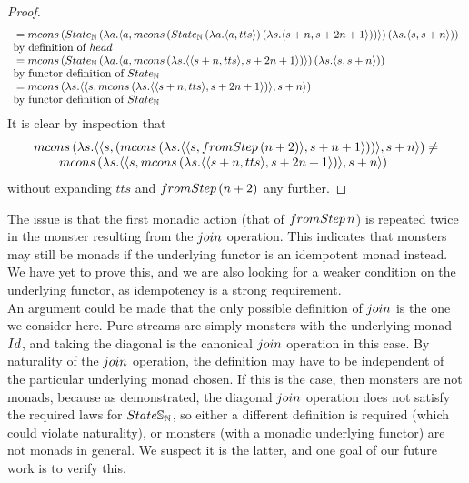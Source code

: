 \begin{proof}
$$\begin{array}{ll}
{}=  \mcons\, (\state_{\nat}\,(\lambda a . \pair{a}{  
\mcons\, (\state_{\nat} \,(\lambda a . \pair{a}{tts})\, (\lambda s . \pair{s + n}{s + 2n + 1}))
})\, (\lambda s. \pair{s}{s + n}))
\\ \mbox{by definition of } \head \\
{}= \mcons\, (\state_{\nat}\,(\lambda a . \pair{a}{  
\mcons\, (\lambda s . \pair{\pair{s + n}{tts}}{s + 2n + 1})
})\, (\lambda s. \pair{s}{s + n})) \\
\mbox{by functor definition of } \state_{\nat}  \\
{}= \mcons\, (\lambda s. \pair{\pair{s}{\mcons\, (\lambda s . \pair{\pair{s + n}{tts}}{s + 2n + 1})}}{s + n}) \\ 
\mbox{by functor definition of } \state_{\nat} \\
\end{array} 
$$
It is clear by inspection that 
$$
\begin{array}{l}
\mcons\, (\lambda s. \pair{\pair{s}{(\mcons\, (\lambda s. \pair{\pair{s}{\fromstepstr\, (n + 2)}}{s + n + 1}))}}{s + n}) \neq \\
\qquad \mcons\, (\lambda s. \pair{\pair{s}{\mcons\, (\lambda s . \pair{\pair{s + n}{tts}}{s + 2n + 1})}}{s + n})
\end{array} 
$$
without expanding $tts$ and $\fromstepstr\, (n + 2)$ any further.
\end{proof}

The issue is that the first monadic action (that of $\fromstepstr\, n$) is repeated twice in the monster resulting from the $\join$ operation. 
This indicates that monsters may still be monads if the underlying functor is an idempotent monad instead. 
We have yet to prove this, and we are also looking for a weaker condition on the underlying functor, as idempotency is a strong requirement. \\

An argument could be made that the only possible definition of $\join$ is the one we consider here. Pure streams are simply monsters with the underlying monad $\Id$, and taking the diagonal is the canonical $\join$ operation in this case. By naturality of the $\join$ operation, the definition may have to be independent of the particular underlying monad chosen. If this is the case, then monsters are not monads, because as demonstrated, the diagonal $\join$ operation does not satisfy the required laws for $\state\stream{\nat}$, so either a different definition is required (which could violate naturality), or monsters (with a monadic underlying functor) are not monads in general. We suspect it is the latter, and one goal of our future work is to verify this.
